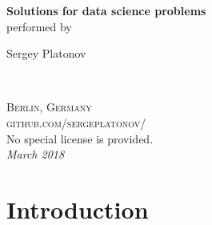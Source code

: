 \documentclass[11pt,fleqn]{book} %
\begin{document}

\begingroup
\thispagestyle{empty}
\centering
\vspace*{5cm}
\par\normalfont\fontsize{35}{35}\sffamily\selectfont
\textbf{Solutions for data science problems}\\
{\LARGE performed by}\par %
\vspace*{1cm}
{\Huge Sergey Platonov}\par %
\endgroup


\newpage
~\vfill
\thispagestyle{empty}

\noindent \textsc{Berlin, Germany}\\

\noindent \textsc{github.com/sergeplatonov/}\\ %

\noindent No special license is provided.\\ %

\noindent \textit{March 2018} %



\pagestyle{empty} %

\tableofcontents %


\pagestyle{fancy} %

\chapter{Introduction}
\end{document}
